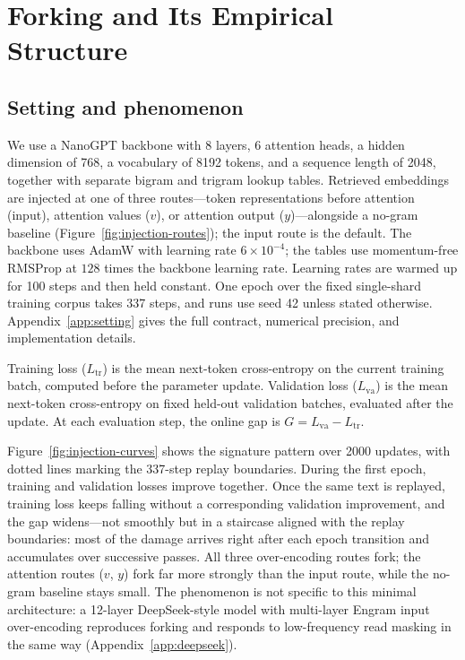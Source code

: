 \section{Forking and Its Empirical Structure}
\label{sec:empirical}

\subsection{Setting and phenomenon}
\label{sec:setting}

We use a NanoGPT backbone with 8 layers, 6 attention heads, a hidden dimension of 768, a vocabulary of 8192 tokens, and a sequence length of 2048, together with separate bigram and trigram lookup tables. Retrieved embeddings are injected at one of three routes---token representations before attention (input), attention values ($v$), or attention output ($y$)---alongside a no-gram baseline (Figure~\ref{fig:injection-routes}); the input route is the default. The backbone uses AdamW with learning rate $6\times10^{-4}$; the tables use momentum-free RMSProp at $128$ times the backbone learning rate. Learning rates are warmed up for 100 steps and then held constant. One epoch over the fixed single-shard training corpus takes 337 steps, and runs use seed 42 unless stated otherwise. Appendix~\ref{app:setting} gives the full contract, numerical precision, and implementation details.

Training loss ($L_{\mathrm{tr}}$) is the mean next-token cross-entropy on the current training batch, computed before the parameter update. Validation loss ($L_{\mathrm{va}}$) is the mean next-token cross-entropy on fixed held-out validation batches, evaluated after the update. At each evaluation step, the online gap is $G=L_{\mathrm{va}}-L_{\mathrm{tr}}$.

Figure~\ref{fig:injection-curves} shows the signature pattern over 2000 updates, with dotted lines marking the 337-step replay boundaries. During the first epoch, training and validation losses improve together. Once the same text is replayed, training loss keeps falling without a corresponding validation improvement, and the gap widens---not smoothly but in a staircase aligned with the replay boundaries: most of the damage arrives right after each epoch transition and accumulates over successive passes. All three over-encoding routes fork; the attention routes ($v$, $y$) fork far more strongly than the input route, while the no-gram baseline stays small. The phenomenon is not specific to this minimal architecture: a 12-layer DeepSeek-style model with multi-layer Engram input over-encoding reproduces forking and responds to low-frequency read masking in the same way (Appendix~\ref{app:deepseek}).

